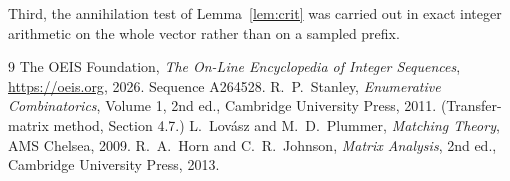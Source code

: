\documentclass[11pt,a4paper]{article}
\theoremstyle{plain}
\theoremstyle{definition}
\begin{document}
Third, the annihilation test of Lemma~\ref{lem:crit} was carried out in exact integer
arithmetic on the whole vector rather than on a sampled prefix.

\begin{thebibliography}{9}
 The OEIS Foundation, \emph{The On-Line Encyclopedia of Integer
Sequences}, \url{https://oeis.org}, 2026. Sequence A264528.
 R.~P.~Stanley, \emph{Enumerative Combinatorics}, Volume 1, 2nd ed.,
Cambridge University Press, 2011. (Transfer-matrix method, Section 4.7.)
 L.~Lov\'asz and M.~D.~Plummer, \emph{Matching Theory}, AMS Chelsea, 2009.
 R.~A.~Horn and C.~R.~Johnson, \emph{Matrix Analysis}, 2nd ed., Cambridge
University Press, 2013.
\end{thebibliography}
\end{document}
